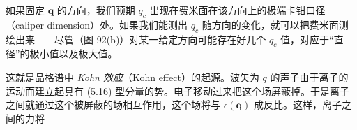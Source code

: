 

如果固定 $\mathbf{q}$ 的方向，我们预期 $q_{c}$ 出现在费米面在该方向上的极端卡钳口径（caliper dimension）处。如果我们能测出 $q_{c}$ 随方向的变化，就可以把费米面测绘出来——尽管（图 92(b)）对某一给定方向可能存在好几个 $q_{c}$ 值，对应于“直径”的极小值以及极大值。

这就是晶格谱中 \emph{Kohn 效应}（Kohn effect）的起源。波矢为 $q$ 的声子由于离子的运动而建立起具有 (5.16) 型分量的势。电子移动过来把这个场屏蔽掉。于是离子之间就通过这个被屏蔽的场相互作用，这个场将与 $\epsilon(\mathbf{q})$ 成反比。这样，离子之间的力将
